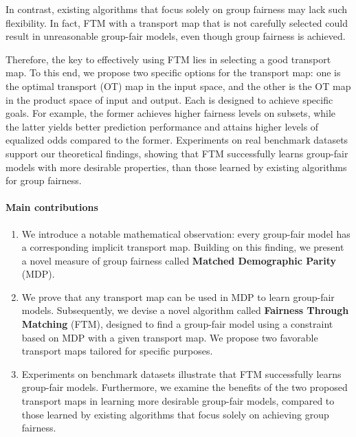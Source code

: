 \documentclass[10pt]{article} %
\begin{document}
In contrast, existing algorithms that focus solely on group fairness may lack such flexibility.
In fact, FTM with a transport map that is not carefully selected could result in unreasonable group-fair models, even though group fairness is achieved.

Therefore, the key to effectively using FTM lies in selecting a good transport map.
To this end, we propose two specific options for the transport map: one is the optimal transport (OT) map in the input space, and the other is the OT map in the product space of input and output.
Each is designed to achieve specific goals.
For example, the former achieves higher fairness levels on subsets, while the latter yields better prediction performance and attains higher levels of equalized odds compared to the former.
Experiments on real benchmark datasets support our theoretical findings, showing that FTM successfully learns group-fair models with more desirable properties, than those learned by existing algorithms for group fairness.


\paragraph{Main contributions}
\begin{enumerate} %
    \item
    We introduce a notable mathematical observation: every group-fair model has a corresponding implicit transport map.
    Building on this finding, we present a novel measure of group fairness called \textbf{Matched Demographic Parity} (MDP).

    \item
    We prove that any transport map can be used in MDP to learn group-fair models. 
    Subsequently, we devise a novel algorithm called \textbf{Fairness Through Matching} (FTM), designed to find a group-fair model using a constraint based on MDP with a given transport map.
    We propose two favorable transport maps tailored for specific purposes.

    \item
    Experiments on benchmark datasets illustrate that FTM successfully learns group-fair models.
    Furthermore, we examine the benefits of the two proposed transport maps in learning more desirable group-fair models, compared to those learned by existing algorithms that focus solely on achieving group fairness.
\end{enumerate}
\end{document}
